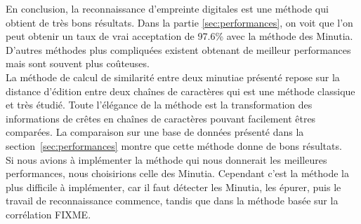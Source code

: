 En conclusion, la reconnaissance d'empreinte digitales est une méthode
qui obtient de très bons résultats. Dans la partie
\ref{sec:performances}, on voit que l'on peut obtenir un taux de vrai
acceptation de 97.6\% avec la méthode des Minutia. D'autres méthodes
plus compliquées existent obtenant de meilleur performances mais sont
souvent plus coûteuses.\\

La méthode de calcul de similarité entre deux minutiae présenté repose
sur la distance d'édition entre deux chaînes de caractères qui est une
méthode classique et très étudié. Toute l'élégance de la méthode est
la transformation des informations de crêtes en chaînes de caractères
pouvant facilement êtres comparées. La comparaison sur une base de
données présenté dans la section~\ref{sec:performances} montre que
cette méthode donne de bons résultats.\\

Si nous avions à implémenter la méthode qui nous donnerait les
meilleures performances, nous choisirions celle des Minutia. Cependant
c'est la méthode la plus difficile à implémenter, car il faut détecter
les Minutia, les épurer, puis le travail de reconnaissance commence,
tandis que dans la méthode basée sur la corrélation FIXME.



